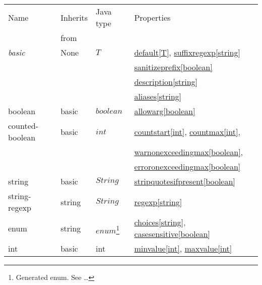\documentclass[a4paper]{article}
\begin{document}
\begin{table}[th]
  \centering
  \begin{tabular}{llll}
   \toprule 
    Name           & Inherits\quad\quad & Java type & Properties   \\
                   & from               &           &              \\
    \midrule
    \textit{basic} & None  & $T$      & \hyperref[prop:default]{default[T]}, \hyperref[prop:suffixregexp]{suffixregexp[string]}\\
                   &       &          & \hyperref[prop:sanitizeprefix]{sanitizeprefix[boolean]}\\
                   &       &          & \hyperref[prop:description]{description[string]}\\
                   &       &          & \hyperref[prop:aliases]{aliases[string]}\\
    \hline
    
    boolean        & basic & $boolean$& \hyperref[prop:allowarg]{allowarg[boolean]} \\
    \midrule
          
    counted-boolean& basic & $int$    & \hyperref[prop:countstart]{countstart[int]}, \hyperref[prop:countmax]{countmax[int]}, \\
                                  & & & \hyperref[prop:warnonexceedingmax]{warnonexceedingmax[boolean]}, \\
                                  & & & \hyperref[prop:erroronexceedingmax]{erroronexceedingmax[boolean]} \\
    \midrule
                                  
    string         & basic  & $String$ & \hyperref[prop:stripquotesifpresent]{stripquotesifpresent[boolean]}\\
    \midrule
    
    string-regexp  & string & $String$& \hyperref[prop:regexp]{regexp[string]} \\
    \midrule
    
    enum           & string & $enum$\footnote{Generated enum. See \ldots}
                                      & \hyperref[prop:choices]{choices[string]}, \hyperref[prop:casesensitive]{casesensitive[boolean]}
    \\
    \midrule
    
    int            & basic  & int     & \hyperref[prop:minvalue]{minvalue[int]}, \hyperref[prop:maxvalue]{maxvalue[int]} \\
    \midrule
    

\end{tabular}
\end{table}
\end{document}
